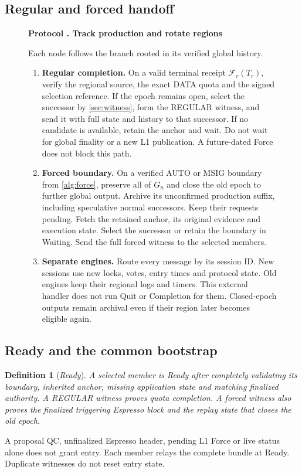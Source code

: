 \documentclass[11pt,a4paper]{article}
\newcommand{\FC}{\mathcal F}
\newcommand{\defterm}[1]{\textcolor{rrBlue}{\textit{#1}}}
\newtheorem{definition}{Definition}[section]
\newcounter{protocol}
\newenvironment{protocol}[2]{\begin{figure}[htbp]\refstepcounter{protocol}\label{#1}
\begin{mdframed}[linewidth=.6pt,skipabove=0pt,skipbelow=0pt,
innertopmargin=7pt,innerbottommargin=7pt]\small
\textbf{Protocol \theprotocol. #2}\par\smallskip}{\end{mdframed}\end{figure}}
\begin{document}
\subsection{Regular and forced handoff}
\begin{protocol}{alg:rotation}{Track production and rotate regions}
Each node follows the branch rooted in its verified global history.
\begin{enumerate}[label=\textbf{\arabic*)},itemsep=3pt]
\item \textbf{Regular completion.} On a valid terminal receipt
$\FC_r(T_r)$, verify the regional source, the exact DATA quota and the
signed selection reference. If the epoch remains open, select the
successor by \cref{sec:witness}, form the REGULAR witness, and send it
with full state and history to that successor. If no candidate is
available, retain the anchor and wait. Do not wait for global finality
or a new L1 publication. A future-dated Force does not block this path.

\item \textbf{Forced boundary.} On a verified AUTO or MSIG boundary
from \cref{alg:force}, preserve all of $G_u$ and close the old epoch
to further global output. Archive its unconfirmed production suffix,
including speculative normal successors. Keep their requests pending.
Fetch the retained anchor, its original evidence and execution state.
Select the successor or retain the boundary in Waiting. Send the full
forced witness to the selected members.

\item \textbf{Separate engines.} Route every message by its session
ID. New sessions use new locks, votes, entry times and protocol state.
Old engines keep their regional logs and timers. This external handler
does not run Quit or Completion for them. Closed-epoch outputs remain
archival even if their region later becomes eligible again.
\end{enumerate}
\end{protocol}

\subsection{Ready and the common bootstrap}
\label{sec:ready}
\begin{definition}[\defterm{Ready}]
\label{def:ready}
A selected member is Ready after completely validating its boundary,
inherited anchor, missing application state and matching finalized
authority. A REGULAR witness proves quota completion. A forced witness
also proves the finalized triggering Espresso block and the replay
state that closes the old epoch.
\end{definition}
A proposal QC, unfinalized Espresso header, pending L1 Force or live
status alone does not grant entry. Each member relays the complete
bundle at Ready. Duplicate witnesses do not reset entry state.
\end{document}

